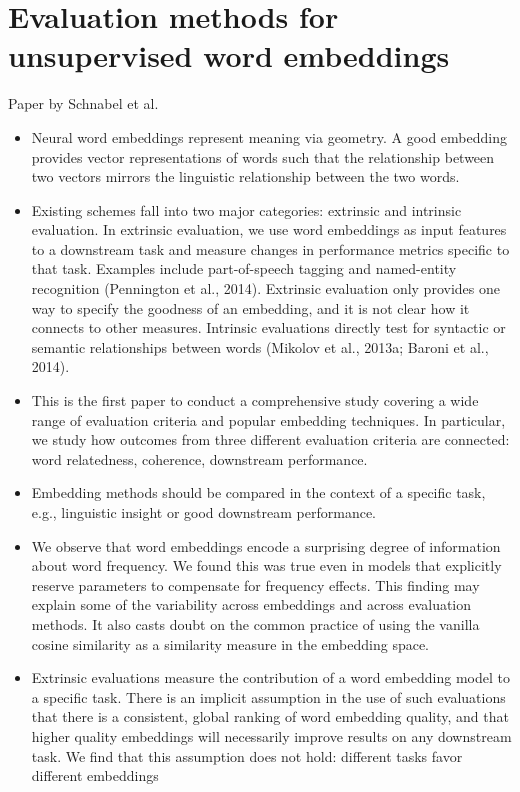 \documentclass[10pt,a4paper]{article}
\begin{document}
\section{Evaluation methods for unsupervised word embeddings}
Paper by Schnabel et al. \cite{schnabel2015evaluation}
\begin{itemize}
\item{Neural word embeddings represent meaning via
geometry. A good embedding provides vector representations
of words such that the relationship between
two vectors mirrors the linguistic relationship
between the two words.}
\item{Existing schemes fall into two major categories: extrinsic and intrinsic evaluation. In extrinsic evaluation, we use word embeddings as input features to a downstream task and measure changes in performance metrics specific to that task. Examples include part-of-speech tagging and named-entity recognition (Pennington et al., 2014). Extrinsic evaluation only provides one way to specify the goodness of an embedding, and it is not clear how it connects to other measures. Intrinsic evaluations directly test for syntactic or semantic relationships between words (Mikolov et al., 2013a; Baroni et al., 2014).}
\item{This is the first paper to conduct a comprehensive study covering a wide range of evaluation criteria and popular embedding techniques. In particular, we study how outcomes from three different evaluation criteria are connected: word relatedness, coherence, downstream performance.}
\item{Embedding methods should be compared in the context of a specific task, e.g., linguistic insight or good downstream performance.}
\item{We observe that word embeddings encode a surprising degree of information about word frequency. We found this was true even in models that explicitly reserve parameters to compensate for frequency effects. This finding may explain some of the variability across embeddings and across evaluation methods. It also casts doubt on the common practice of using the vanilla cosine similarity as a similarity measure in the embedding space.}
\item{Extrinsic evaluations measure the contribution of a word embedding model to a specific task. There is an implicit assumption in the use of such evaluations that there is a consistent, global ranking of word embedding quality, and that higher quality embeddings will necessarily improve results on any downstream task. We find that this assumption does not hold: different tasks favor different embeddings}

\end{itemize}
\end{document}
